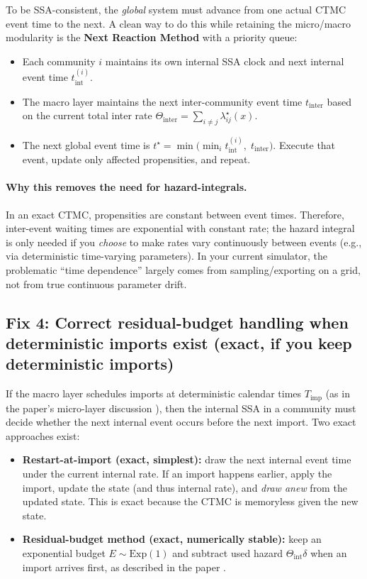 \documentclass[11pt,a4paper]{article}
\begin{document}
To be SSA-consistent, the \emph{global} system must advance from one actual CTMC event time to the next.
A clean way to do this while retaining the micro/macro modularity is the \textbf{Next Reaction Method}
with a priority queue:

\begin{itemize}[leftmargin=*]
\item Each community $i$ maintains its own internal SSA clock and next internal event time $t^{(i)}_{\text{int}}$.
\item The macro layer maintains the next inter-community event time $t_{\text{inter}}$ based on the current
total inter rate $\Theta_{\text{inter}}=\sum_{i\ne j}\lambda^{\star}_{ij}(x)$.
\item The next global event time is $t^\star=\min\bigl(\min_i t^{(i)}_{\text{int}},\; t_{\text{inter}}\bigr)$.
Execute that event, update only affected propensities, and repeat.
\end{itemize}

\paragraph{Why this removes the need for hazard-integrals.}
In an exact CTMC, propensities are constant between event times. Therefore, inter-event waiting times
are exponential with constant rate; the hazard integral is only needed if you \emph{choose} to make rates vary
continuously between events (e.g., via deterministic time-varying parameters). In your current simulator,
the problematic ``time dependence'' largely comes from sampling/exporting on a grid, not from true continuous
parameter drift.

\subsection{Fix 4: Correct residual-budget handling when deterministic imports exist (exact, if you keep deterministic imports)}
If the macro layer schedules imports at deterministic calendar times $T_{\text{imp}}$ (as in the paper's micro-layer
discussion \cite{paper}), then the internal SSA in a community must decide whether the next internal event occurs
before the next import. Two exact approaches exist:

\begin{itemize}[leftmargin=*]
\item \textbf{Restart-at-import (exact, simplest):} draw the next internal event time under the current internal rate.
If an import happens earlier, apply the import, update the state (and thus internal rate), and \emph{draw anew}
from the updated state. This is exact because the CTMC is memoryless given the new state.
\item \textbf{Residual-budget method (exact, numerically stable):} keep an exponential budget $E\sim\mathrm{Exp}(1)$
and subtract used hazard $\Theta_{\text{int}}\delta$ when an import arrives first, as described in the paper \cite{paper}.
\end{itemize}
\end{document}
